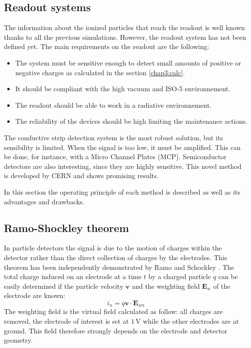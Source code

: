 \begin{refsection}
  \section{Readout systems}
  The information about the ionized particles that reach the readout is well known thanks to all the previous simulations. However, the readout system has not been defined yet. The main requirements on the readout are the following:
  \begin{itemize}
    \item The system must be sensitive enough to detect small amounts of positive or negative charges as calculated in the section \ref{chap3:calc}.
    \item It should be compliant with the high vacuum and ISO-5 environnement.
    \item The readout should be able to work in a radiative environnement.
    \item The reliability of the devices should be high limiting the maintenance actions.
  \end{itemize}

  The conductive strip detection system is the most robust solution, but its sensibility is limited. When the signal is too low, it must be amplified. This can be done, for instance, with a Micro Channel Plates (MCP). Semiconductor detectors are also interesting, since they are highly sensitive. This novel method is developed by CERN and shows promising results.

  In this section the operating principle of each method is described as well as its advantages and drawbacks.

  \subsection{Ramo-Shockley theorem}
  \label{chap3:ramo}
  In particle detectors the signal is due to the motion of charges within the detector rather than the direct collection of charges by the electrodes. This theorem has been independently demonstrated by Ramo and Schockley \cite{Ramo_1939,Shockley_1938}. The total charge induced on an electrode at a time $t$ by a charged particle $q$ can be easily determined if the particle velocity $\boldsymbol{v}$ and the weighting field $\boldsymbol{E}_{w}$ of the electrode are known:
  \begin{equation}
    i_{n}= q\boldsymbol{v} \cdot \boldsymbol{E}_{wn}
  \end{equation}
  The weighting field is the virtual field calculated as follow: all charges are removed, the electrode of interest is set at $1\,\mathrm{V}$ while the other electrodes are at ground. This field therefore strongly depends on the electrode and detector geometry.


\end{refsection}
